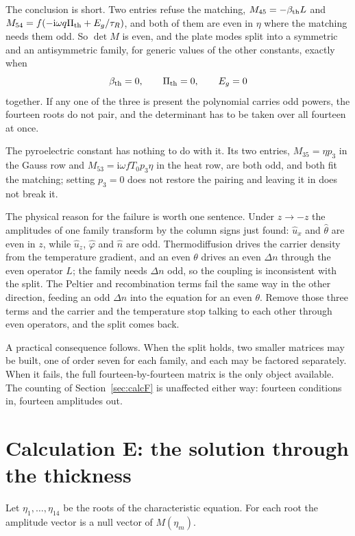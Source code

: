 \documentclass[11pt]{article}
\newcommand{\ii}{\mathrm{i}}
\begin{document}
The conclusion is short. Two entries refuse the matching, $M_{45}=-\beta_{\rm th}L$ and
$M_{54}=f(-\ii\omega q\Pi_{\rm th}+E_g/\tau_R)$, and both of them are even in $\eta$ where the matching
needs them odd. So $\det M$ is even, and the plate modes split into a symmetric and an antisymmetric
family, for generic values of the other constants, exactly when
\begin{equation}
\beta_{\rm th}=0,\qquad \Pi_{\rm th}=0,\qquad E_g=0
\end{equation}
together. If any one of the three is present the polynomial carries odd powers, the fourteen roots do not
pair, and the determinant has to be taken over all fourteen at once.

The pyroelectric constant has nothing to do with it. Its two entries, $M_{35}=\eta p_3$ in the Gauss row
and $M_{53}=\ii\omega fT_0p_3\eta$ in the heat row, are both odd, and both fit the matching; setting
$p_3=0$ does not restore the pairing and leaving it in does not break it.

The physical reason for the failure is worth one sentence. Under $z\to-z$ the amplitudes of one family
transform by the column signs just found: $\hat u_x$ and $\hat\theta$ are even in $z$, while $\hat u_z$,
$\hat\varphi$ and $\hat n$ are odd. Thermodiffusion drives the carrier density from the temperature
gradient, and an even $\theta$ drives an even $\Delta n$ through the even operator $L$; the family needs
$\Delta n$ odd, so the coupling is inconsistent with the split. The Peltier and recombination terms fail
the same way in the other direction, feeding an odd $\Delta n$ into the equation for an even $\theta$.
Remove those three terms and the carrier and the temperature stop talking to each other through even
operators, and the split comes back.

A practical consequence follows. When the split holds, two smaller matrices may be built, one of order
seven for each family, and each may be factored separately. When it fails, the full fourteen-by-fourteen
matrix is the only object available. The counting of Section~\ref{sec:calcF} is unaffected either way:
fourteen conditions in, fourteen amplitudes out.

\section{Calculation E: the solution through the thickness}\label{sec:calcE}

Let $\eta_1,\dots,\eta_{14}$ be the roots of the characteristic equation. For each root the amplitude
vector is a null vector of $M(\eta_m)$.
\end{document}
